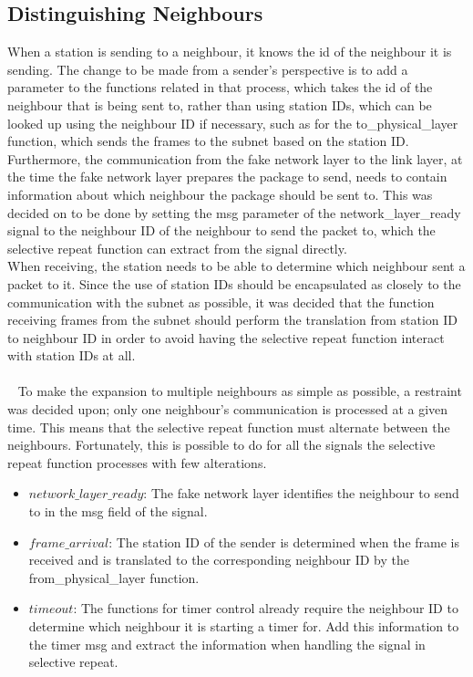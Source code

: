 \subsection{Distinguishing Neighbours}
When a station is sending to a neighbour, it knows the id of the neighbour it is sending. The change to be made from a sender's perspective is to add a parameter to the functions related in that process, which takes the id of the neighbour that is being sent to, rather than using station IDs, which can be looked up using the neighbour ID if necessary, such as for the to\_physical\_layer function, which sends the frames to the subnet based on the station ID. Furthermore, the communication from the fake network layer to the link layer, at the time the fake network layer prepares the package to send, needs to contain information about which neighbour the package should be sent to. This was decided on to be done by setting the msg parameter of the network\_layer\_ready signal to the neighbour ID of the neighbour to send the packet to, which the selective repeat function can extract from the signal directly.\\
When receiving, the station needs to be able to determine which neighbour sent a packet to it. Since the use of station IDs should be encapsulated as closely to the communication with the subnet as possible, it was decided that the function receiving frames from the subnet should perform the translation from station ID to neighbour ID in order to avoid having the selective repeat function interact with station IDs at all.\\
\\~
To make the expansion to multiple neighbours as simple as possible, a restraint was decided upon; only one neighbour's communication is processed at a given time. This means that the selective repeat function must alternate between the neighbours. Fortunately, this is possible to do for all the signals the selective repeat function processes with few alterations.
\begin{itemize}
  \item $network\_layer\_ready$: The fake network layer identifies the neighbour to send to in the msg field of the signal.
  \item $frame\_arrival$: The station ID of the sender is determined when the frame is received and is translated to the corresponding neighbour ID by the\\ from\_physical\_layer function. %
  \item $timeout$: The functions for timer control already require the neighbour ID to determine which neighbour it is starting a timer for. Add this information to the timer msg and extract the information when handling the signal in selective repeat.
\end{itemize}

